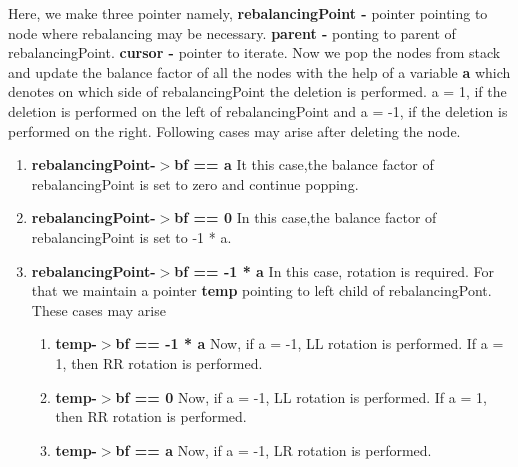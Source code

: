 \documentclass[12pt]{article}
\begin{document}
\begin{enumerate}
    Here, we make three pointer namely, \newline 
    \textbf{rebalancingPoint - } pointer pointing to node where rebalancing may be necessary.\newline 
    \textbf{parent - } ponting to parent of rebalancingPoint.\newline
    \textbf{cursor - } pointer to iterate. \newline
    Now we pop the nodes from stack and update the balance factor of all the nodes with the help of a variable \textbf{a} which denotes on which side of rebalancingPoint the deletion is performed. a = 1, if the deletion is performed on the left of rebalancingPoint and a = -1, if the deletion is performed on the right. Following cases may arise after deleting the node.
    \begin{enumerate} [label=\roman*]
            \item \textbf{rebalancingPoint-$>$bf == a}\newline
            It this case,the balance factor of rebalancingPoint is set to zero and continue popping.
            \item \textbf{rebalancingPoint-$>$bf == 0}\newline
            In this case,the balance factor of rebalancingPoint is set to -1 * a.
            \item \textbf{rebalancingPoint-$>$bf == -1 * a}\newline
            In this case, rotation is required. For that we maintain a pointer \textbf{temp} pointing to left child of rebalancingPont.
            These cases may arise
            \begin{enumerate} [label=\roman*]
                \item \textbf{temp-$>$bf == -1 * a}\newline
                Now, if a = -1, LL rotation is performed. \newline
                If a = 1, then RR rotation is performed. 
                \item \textbf{temp-$>$bf == 0} \newline
                Now, if a = -1, LL rotation is performed. \newline
                If a = 1, then RR rotation is performed. 
                \item \textbf{temp-$>$bf == a} \newline
                Now, if a = -1, LR rotation is performed. \newline

\end{enumerate}
\end{enumerate}
\end{enumerate}
\end{document}

